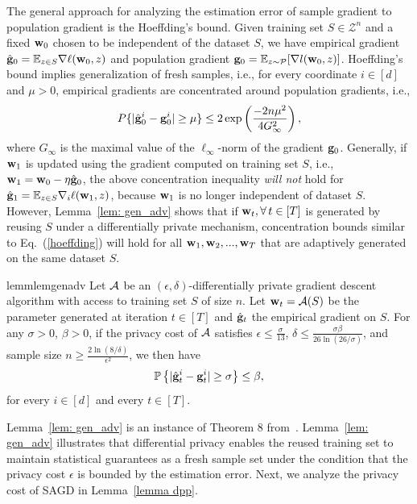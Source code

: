 \documentclass[11pt]{article}
\begin{document}
The general approach for analyzing the estimation error of sample gradient to population gradient is the Hoeffding’s bound. 
Given training set $S \in \mathcal{Z}^n$ and a fixed $\mathbf{w}_0$ chosen to be independent of the dataset $S$,  we have empirical gradient $\hat {\mathbf{g}}_0= \mathbb{E}_{z \in S}\nabla \ell(\mathbf{w}_0,z)$ and population gradient $\mathbf{g}_0 = \mathbb{E}_{z\sim \mathcal{P}}[\nabla l(\mathbf{w}_0,z)]$. Hoeffding’s bound implies generalization of fresh samples, i.e., for every coordinate $i \in [d]$ and $\mu > 0$,  empirical gradients are concentrated around population gradients, i.e., 
	\begin{equation} \label{hoeffding}
	P\{|\hat {\mathbf{g}}^i_0 - \mathbf{g}_0^i | \geq \mu \} \leq2 \exp \left(\frac{-2n\mu^2}{4G_\infty^2} \right),
	\end{equation}
 where $G_\infty$ is the maximal value of the $\ell_\infty$-norm of the gradient $ \mathbf{g}_0$. Generally, if $\mathbf{w}_1$ is updated using the gradient computed on training set $S$, i.e., $\mathbf{w}_1 = \mathbf{w}_0 - \eta \hat {\mathbf{g}}_0$, the above concentration inequality \emph{will not} hold for $\hat {\mathbf{g}}_1 = \mathbb{E}_{z \in S}\nabla_i \ell(\mathbf{w}_1,z)$, because $\mathbf{w}_1$ is no longer independent of dataset $S$. However, Lemma~\ref{lem: gen_adv} shows that if $\mathbf{w}_t, \forall\, t \in [T]$ is generated by reusing $S$ under a differentially private mechanism, concentration bounds similar to Eq.~(\ref{hoeffding}) will hold for all $\mathbf{w}_1, \mathbf{w}_2,...,\mathbf{w}_T$ that are adaptively generated on the same dataset $S$. 

\begin{restatable}{lemm}{lemgenadv}
\label{lem: gen_adv}
	Let $\cA$ be an $(\epsilon, \delta)$-differentially private gradient descent algorithm with access to training set $S$ of size $n$. Let $\w_t = \cA(S)$ be the parameter generated at iteration $t \in [T]$ and $\hat {\mathbf{g}}_t$ the empirical gradient on $S$. For any $\sigma >0$, $\beta > 0$, if the privacy cost of $\cA$ satisfies $\epsilon \leq \frac{\sigma}{13}$, $\delta \leq \frac{\sigma \beta}{26 \ln(26/\sigma)}$, and sample size $n \geq \frac{2\ln(8/\delta)}{\epsilon^2}$, we then have
	\begin{equation*}
	\mathbb{P}\left\{ |\hat {\mathbf{g}}_t^i - \mathbf{g}_t^i| \geq  \sigma \right\} \leq \beta,
	\end{equation*}
	for every $ i\in [d]$ and every $t \in [T]$. 
\end{restatable}
Lemma~\ref{lem: gen_adv} is an instance of Theorem 8 from~\cite{dwfe15}. 
Lemma~\ref{lem: gen_adv} illustrates that differential privacy enables the reused training set to maintain  statistical guarantees as a fresh sample set under the condition that the privacy cost $\epsilon$ is bounded by the estimation error. Next, we analyze the privacy cost of SAGD in Lemma~\ref{lemma dpp}.
\end{document}
